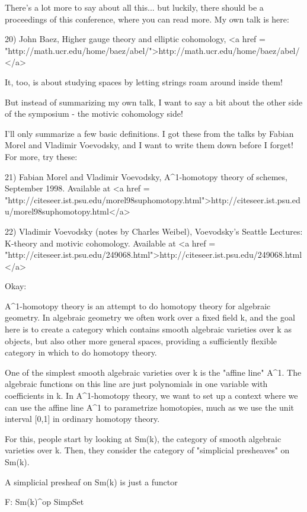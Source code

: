 There's a lot more to say about all this... but luckily, there 
should be a proceedings of this conference, where you can read 
more.  My own talk is here:

20) John Baez, Higher gauge theory and elliptic cohomology,
<a href = "http://math.ucr.edu/home/baez/abel/">http://math.ucr.edu/home/baez/abel/</a>

It, too, is about studying spaces by letting strings roam
around inside them! 

But instead of summarizing my own talk, I want to say a
bit about the other side of the symposium - the motivic 
cohomology side!

I'll only summarize a few basic definitions.  I got these from
the talks by Fabian Morel and Vladimir Voevodsky, and I want
to write them down before I forget!  For more, try these:

21) Fabian Morel and Vladimir Voevodsky, A^{1}-homotopy theory
of schemes, September 1998.  Available at 
<a href = "http://citeseer.ist.psu.edu/morel98suphomotopy.html">http://citeseer.ist.psu.edu/morel98suphomotopy.html</a>

22) Vladimir Voevodsky (notes by Charles Weibel), 
Voevodsky's Seattle Lectures: K-theory and motivic 
cohomology.  Available at <a href = "http://citeseer.ist.psu.edu/249068.html">http://citeseer.ist.psu.edu/249068.html</a>

Okay:

A^{1}-homotopy theory is an attempt to do homotopy theory for 
algebraic geometry.  In algebraic geometry we often work over
a fixed field k, and the goal here is to create a category 
which contains smooth algebraic varieties over k as objects, 
but also other more general spaces, providing a sufficiently 
flexible category in which to do homotopy theory.

One of the simplest smooth algebraic varieties over k is the
"affine line" A^{1}.  The algebraic functions on
this line are just polynomials in one variable with coefficients in k.
In A^{1}-homotopy theory, we want to set up a context where we
can use the affine line A^{1} to parametrize homotopies, much
as we use the unit interval [0,1] in ordinary homotopy theory.

For this, people start by looking at Sm(k), the category of
smooth algebraic varieties over k.  Then, they consider 
the category of "simplicial presheaves" on Sm(k).  

A simplicial presheaf on Sm(k) is just a functor

F: Sm(k)^{op} \to  SimpSet

